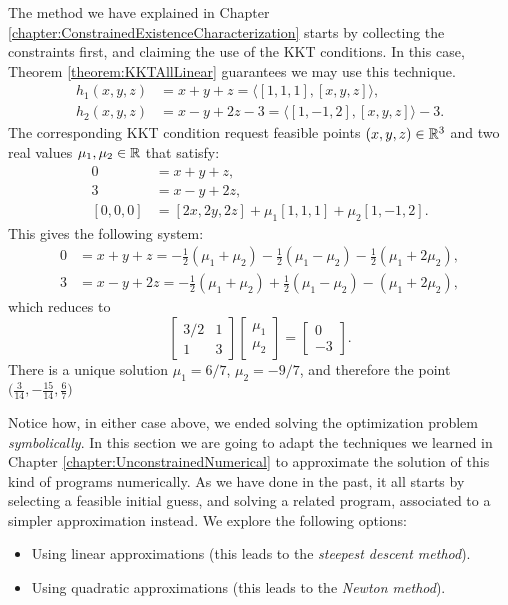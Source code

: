 \begin{example}
The method we have explained in Chapter \ref{chapter:ConstrainedExistenceCharacterization} starts by collecting the constraints first, and claiming the use of the KKT conditions.  In this case, Theorem \ref{theorem:KKTAllLinear} guarantees we may use this technique.
\begin{align*}
h_1(x,y,z) &= x+y+z = \langle [1,1,1], [x,y,z]\rangle, \\
h_2(x,y,z) &= x-y+2z-3 = \langle [1,-1,2],[x,y,z] \rangle -3.
\end{align*}
The corresponding KKT condition request feasible points $(x,y,z) \in \mathbb{R}^3$ and two real values $\mu_1, \mu_2 \in \mathbb{R}$ that satisfy:
\begin{align*}
0 &= x+y+z, \\
3 &= x-y+2z, \\
[0,0,0] &= [2x,2y, 2z] + \mu_1 [1,1,1] + \mu_2 [1,-1,2].
\end{align*}
This gives the following system:
\begin{align*}
0 &= x+y+z = -\tfrac{1}{2}(\mu_1+\mu_2) -\tfrac{1}{2}(\mu_1-\mu_2) -\tfrac{1}{2}(\mu_1+2\mu_2), \\
3 &= x-y+2z = -\tfrac{1}{2}(\mu_1+\mu_2) + \tfrac{1}{2}(\mu_1-\mu_2) - (\mu_1+2\mu_2),
\end{align*}
which reduces to 
\begin{equation*}
\begin{bmatrix}  3/2 & 1 \\ 1 & 3 \end{bmatrix} \begin{bmatrix} \mu_1 \\ \mu_2 \end{bmatrix} = \begin{bmatrix} 0 \\ -3 \end{bmatrix}.
\end{equation*}
There is a unique solution $\mu_1 = 6/7$, $\mu_2 = -9/7$, and therefore the point $\big( \tfrac{3}{14}, -\tfrac{15}{14}, \tfrac{6}{7} \big)$
\end{example}

\separator

Notice how, in either case above, we ended solving the optimization problem \emph{symbolically}.  In this section we are going to adapt the techniques we learned in Chapter \ref{chapter:UnconstrainedNumerical} to approximate the solution of this kind of programs numerically.  As we have done in the past, it all starts by selecting a feasible initial guess, and solving a related program, associated to a simpler approximation instead.  We explore the following options:
\begin{itemize}
	\item Using linear approximations (this leads to the \emph{steepest descent method}).
	\item Using quadratic approximations (this leads to the \emph{Newton method}).
\end{itemize}

